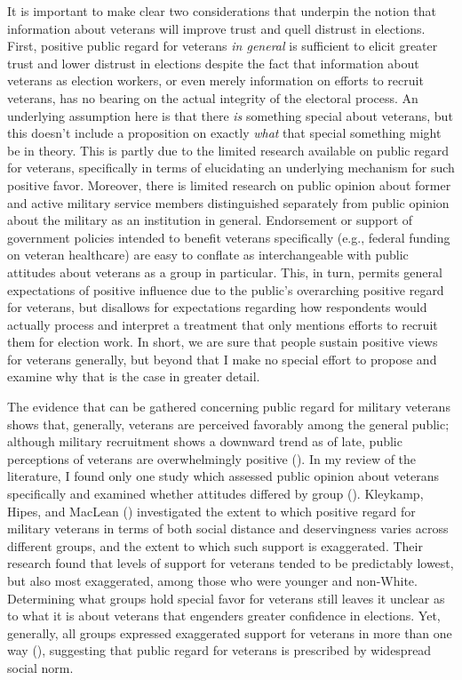 \documentclass[
  12pt,
  letterpaper,
]{article}
\begin{document}
It is important to make clear two considerations that underpin the
notion that information about veterans will improve trust and quell
distrust in elections. First, positive public regard for veterans
\emph{in general} is sufficient to elicit greater trust and lower
distrust in elections despite the fact that information about veterans
as election workers, or even merely information on efforts to recruit
veterans, has no bearing on the actual integrity of the electoral
process. An underlying assumption here is that there \emph{is} something
special about veterans, but this doesn't include a proposition on
exactly \emph{what} that special something might be in theory. This is
partly due to the limited research available on public regard for
veterans, specifically in terms of elucidating an underlying mechanism
for such positive favor. Moreover, there is limited research on public
opinion about former and active military service members distinguished
separately from public opinion about the military as an institution in
general. Endorsement or support of government policies intended to
benefit veterans specifically (e.g., federal funding on veteran
healthcare) are easy to conflate as interchangeable with public
attitudes about veterans as a group in particular. This, in turn,
permits general expectations of positive influence due to the public's
overarching positive regard for veterans, but disallows for expectations
regarding how respondents would actually process and interpret a
treatment that only mentions efforts to recruit them for election work.
In short, we are sure that people sustain positive views for veterans
generally, but beyond that I make no special effort to propose and
examine why that is the case in greater detail.

The evidence that can be gathered concerning public regard for military
veterans shows that, generally, veterans are perceived favorably among
the general public; although military recruitment shows a downward trend
as of late, public perceptions of veterans are overwhelmingly positive
(). In my
review of the literature, I found only one study which assessed public
opinion about veterans specifically and examined whether attitudes
differed by group (). Kleykamp, Hipes, and MacLean
() investigated the extent to which
positive regard for military veterans in terms of both social distance
and deservingness varies across different groups, and the extent to
which such support is exaggerated. Their research found that levels of
support for veterans tended to be predictably lowest, but also most
exaggerated, among those who were younger and non-White. Determining
what groups hold special favor for veterans still leaves it unclear as
to what it is about veterans that engenders greater confidence in
elections. Yet, generally, all groups expressed exaggerated support for
veterans in more than one way (), suggesting that public regard for veterans is
prescribed by widespread social norm.
\end{document}
